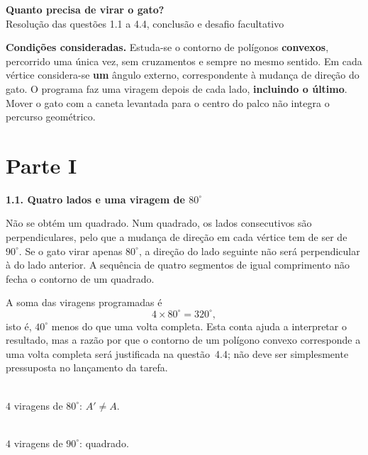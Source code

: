 \begin{center}
{\large\bfseries\color{azulPDMI}Quanto precisa de virar o gato?}\\[2pt]
{\small Resolução das questões 1.1 a 4.4, conclusão e desafio facultativo}
\end{center}

\begin{nota}
\textbf{Condições consideradas.} Estuda-se o contorno de polígonos
\textbf{convexos}, percorrido uma única vez, sem cruzamentos e sempre
no mesmo sentido. Em cada vértice considera-se \textbf{um} ângulo
externo, correspondente à mudança de direção do gato. O programa
faz uma viragem depois de cada lado, \textbf{incluindo o último}.
Mover o gato com a caneta levantada para o centro do palco não integra
o percurso geométrico.
\end{nota}

\section*{Parte I}

\noindent\textbf{1.1. Quatro lados e uma viragem de $80^\circ$}

Não se obtém um quadrado. Num quadrado, os lados consecutivos são
perpendiculares, pelo que a mudança de direção em cada vértice tem
de ser de $90^\circ$. Se o gato virar apenas $80^\circ$, a direção
do lado seguinte não será perpendicular à do lado anterior. A
sequência de quatro segmentos de igual comprimento não fecha o
contorno de um quadrado.

A soma das viragens programadas é
\[
4\times80^\circ=320^\circ,
\]
isto é, $40^\circ$ menos do que uma volta completa. Esta conta ajuda
a interpretar o resultado, mas a razão por que o contorno de um
polígono convexo corresponde a uma volta completa será justificada
na questão~4.4; não deve ser simplesmente pressuposta no lançamento
da tarefa.

\begin{center}
\begin{minipage}{.46\linewidth}
\centering
{}\\[-3pt]
{\footnotesize $4$ viragens de $80^\circ$: $A'\neq A$.}
\end{minipage}\hfill
\begin{minipage}{.46\linewidth}
\centering
{}\\[-3pt]
{\footnotesize $4$ viragens de $90^\circ$: quadrado.}
\end{minipage}
\end{center}

